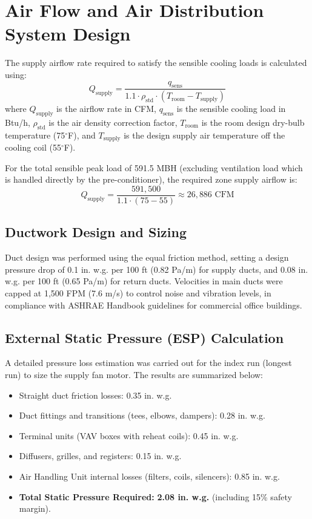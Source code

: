 \section{Air Flow and Air Distribution System Design}
\label{sec:air_distribution}

The supply airflow rate required to satisfy the sensible cooling loads is calculated using:
\begin{equation}
Q_{\text{supply}} = \frac{q_{\text{sens}}}{1.1 \cdot \rho_{\text{std}} \cdot (T_{\text{room}} - T_{\text{supply}})}
\end{equation}
where $Q_{\text{supply}}$ is the airflow rate in CFM, $q_{\text{sens}}$ is the sensible cooling load in Btu/h, $\rho_{\text{std}}$ is the air density correction factor, $T_{\text{room}}$ is the room design dry-bulb temperature (75$^{\circ}$F), and $T_{\text{supply}}$ is the design supply air temperature off the cooling coil (55$^{\circ}$F).

For the total sensible peak load of 591.5 MBH (excluding ventilation load which is handled directly by the pre-conditioner), the required zone supply airflow is:
\begin{equation}
Q_{\text{supply}} = \frac{591,500}{1.1 \cdot (75 - 55)} \approx 26,886 \text{ CFM}
\end{equation}

\subsection{Ductwork Design and Sizing}
Duct design was performed using the equal friction method, setting a design pressure drop of 0.1 in. w.g. per 100 ft (0.82 Pa/m) for supply ducts, and 0.08 in. w.g. per 100 ft (0.65 Pa/m) for return ducts. Velocities in main ducts were capped at 1,500 FPM (7.6 m/s) to control noise and vibration levels, in compliance with ASHRAE Handbook guidelines for commercial office buildings.

\subsection{External Static Pressure (ESP) Calculation}
A detailed pressure loss estimation was carried out for the index run (longest run) to size the supply fan motor. The results are summarized below:
\begin{itemize}
  \item Straight duct friction losses: 0.35 in. w.g.
  \item Duct fittings and transitions (tees, elbows, dampers): 0.28 in. w.g.
  \item Terminal units (VAV boxes with reheat coils): 0.45 in. w.g.
  \item Diffusers, grilles, and registers: 0.15 in. w.g.
  \item Air Handling Unit internal losses (filters, coils, silencers): 0.85 in. w.g.
  \item \textbf{Total Static Pressure Required:} \textbf{2.08 in. w.g.} (including 15\% safety margin).
\end{itemize}
